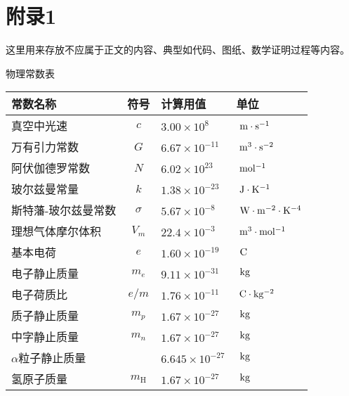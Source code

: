 \section{附录1} %
这里用来存放不应属于正文的内容、典型如代码、图纸、数学证明过程等内容。

物理常数表
\begin{table}[ht]
    \centering
 
    \begin{tabular}{lcll}
    \toprule 
          常数名称 & 符号 & 计算用值 & 单位 \\
    \midrule  

      真空中光速 & $c$ & $3.00\times 10^8$ & $\rm~ m\cdot s^{-1}$ \\
      
      万有引力常数 & $G$ & $6.67\times 10^{-11}$ & $\rm~ m^3\cdot s^{-2}$ \\
      
      阿伏伽德罗常数 & $N$ & $6.02\times 10^{23}$ & $\rm~ mol^{-1}$ \\

      玻尔兹曼常量 & $k$ & $1.38\times 10^{-23}$ & $\rm~ J\cdot K^{-1}$\\

      斯特藩-玻尔兹曼常数 & $\sigma$ & $5.67\times10^{-8}$ & $\rm~ W\cdot m^{-2}\cdot K^{-4}$\\ 
      
      理想气体摩尔体积 & $V_m$ & $22.4\times 10^{-3}$ & $\rm~ m^3\cdot mol^{-1}$ \\

      基本电荷 & $e$ & $1.60\times10^{-19}$ & $\rm~ C$\\

      电子静止质量 & $m_e$ & $9.11\times10^{-31}$ & $\rm~ kg$\\
      
      电子荷质比 & $e/m$ & $1.76\times10^{-11}$ & $\rm~ C\cdot kg^{-2}$\\

      质子静止质量 & $m_p$ & $1.67\times10^{-27}$ & $\rm~ kg$\\
      
      中字静止质量 & $m_n$ & $1.67\times10^{-27}$ & $\rm~ kg$\\
      
      $\alpha $粒子静止质量 &   & $6.645\times10^{-27}$ & $\rm~ kg$\\

      氢原子质量 & $m_\mathrm{H}$ & $1.67\times10^{-27}$ & $\rm~ kg$\\
      

\end{tabular}
\end{table}
